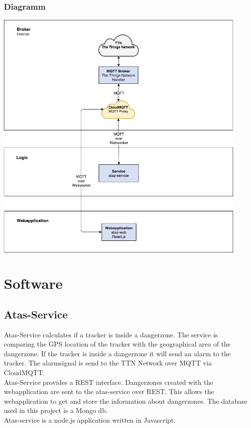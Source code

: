 \documentclass[a4paper,11pt, oneside]{report}
\theoremstyle{definition}
\begin{document}
\subsubsection{Diagramm}
\includegraphics[width=0.94\textwidth]{img/ATAS_SystemOverview_Detail_CloudMQTT.png}


\newpage
\section{Software}
\subsection{Atas-Service}
Atas-Service calculates if a tracker is inside a dangerzone. The service is comparing the GPS location of the tracker with the geographical area of the dangerzone. If the tracker is inside a dangerzone it will send an alarm to the tracker. The alarmsignal is send to the TTN Network over MQTT via CloudMQTT.\\[0.3cm]
Atas-Service provides a REST interface. Dangerzones created with the webapplication are sent to the atas-service over REST. This allows the webapplication to get and store the information about dangerzones. The database used in this project is a Mongo db.\\[0.3cm]
Atas-service is a node.js application written in Javascript.
\end{document}
